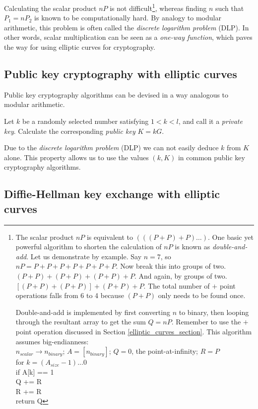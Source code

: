 Calculating the scalar product $nP$ is not difficult\footnote{\label{point_multiplication_note}The scalar product $nP$ is equivalent to $(((P+P)+P)…)$. One basic yet powerful algorithm to shorten the calculation of $nP$ is known as {\em double-and-add}. Let us demonstrate by example. Say $n = 7$, so $nP = P+P+P+P+P+P+P$. Now break this into groups of two. $(P+P) + (P+P) + (P+P) + P$. And again, by groups of two. $[(P+P) + (P+P)] + (P+P) + P$. The total number of $+$ point operations falls from 6 to 4 because $(P+P)$ only needs to be found once.

Double-and-add is implemented by first converting $n$ to binary, then looping through the resultant array to get the sum $Q = nP$. Remember to use the $+$ point operation discussed in Section \ref{elliptic_curves_section}. This algorithm assumes big-endianness:
\\ \newline
$n_{scalar} \rightarrow n_{binary}$; $A = [n_{binary}]$;  $Q=0$, the point-at-infinity; $R=P$\\
for $k = (A_{size} - 1)$...0\\
\indent if A[k] == 1\\
\indent \indent Q += R\\
\indent R += R\\
return Q}, whereas finding $n$ such that $P_1 = n P_2$ is known to be computationally hard. By analogy to modular arithmetic, this problem is often called the {\em discrete logarithm problem} (DLP). In other words, scalar multiplication can be seen as a {\em one-way function}, which paves the way for using elliptic curves for cryptography.

\subsection{Public key cryptography with elliptic curves}
\label{ec:keys}
Public key cryptography algorithms can be devised in a way analogous to modular arithmetic.

Let \(k\) be a randomly selected number satisfying \(1 < k < l\), and call it a {\em private key}. Calculate the corresponding {\em public key} \(K = k G\). 

Due to the {\em discrete logarithm problem} (DLP) we can not easily deduce \(k\) from \(K\) alone. This property allows us to use the values \( (k, K) \) in common public key cryptography algorithms.

\newpage
\subsection{Diffie-Hellman key exchange with elliptic curves}
\label{DH_exchange_section}

